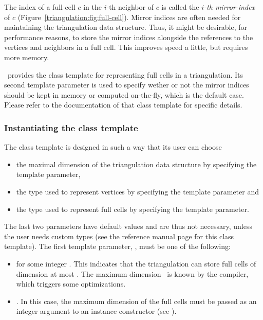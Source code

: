 \begin{ccAdvanced}
The index of a full cell $c$ in the $i$-th neighbor of $c$ is called the
\emph{$i$-th mirror-index} of $c$ (Figure~\ref{triangulation:fig:full-cell}).
Mirror indices are often needed for maintaining the triangulation data
structure. Thus, it might be desirable, for performance reasons, to store the
mirror indices alongside the references to the vertices and neighbors in a full
cell. This improves speed a little, but requires more memory.

\cgal\ provides the class template
 for representing full cells in a triangulation. Its
second template parameter is used to specify wether or not the mirror indices
should be kept in memory or computed on-the-fly, which is the default case.
Please refer to the documentation of that class template for specific details.
\end{ccAdvanced}

\subsubsection{Instantiating the class template}

The 
class template is designed in such a way that its user can choose
\begin{itemize}
\item the maximal dimension of the triangulation data structure by specifying the  template parameter,
\item the type used to represent vertices by specifying the 
template parameter and
\item the type used to represent full cells by specifying the
 template parameter.
\end{itemize}

The last two parameters have default values and are thus not necessary, unless
the user needs custom types (see the reference manual page for this class
template). The first template parameter, , must be
one of the following:
\begin{itemize}
\item \ccPureGlobalScope{} for some integer \ad. This
indicates that the triangulation can store full cells of dimension at most
\ad. The maximum dimension \ad\ is known by the compiler, which
triggers some optimizations. 
\item \ccPureGlobalScope{}. In this case, the maximum
dimension of the full cells must be passed as an integer argument to an instance
constructor (see ).
\end{itemize}

